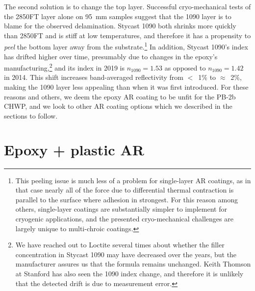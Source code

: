 The second solution is to change the top layer. Successful cryo-mechanical tests of the 2850FT layer alone on 95~mm samples suggest that the 1090 layer is to blame for the observed delamination. Stycast 1090 both shrinks more quickly than 2850FT and is stiff at low temperatures, and therefore it has a propensity to \textit{peel} the bottom layer away from the substrate.\footnote{This peeling issue is much less of a problem for single-layer AR coatings, as in that case nearly all of the force due to differential thermal contraction is parallel to the surface where adhesion in strongest. For this reason among others, single-layer coatings are substantially simpler to implement for cryogenic applications, and the presented cryo-mechanical challenges are largely unique to multi-chroic coatings.} In addition, Stycast 1090's index has drifted higher over time, presumably due to changes in the epoxy's manufacturing,\footnote{We have reached out to Loctite several times about whether the filler concentration in Stycast 1090 may have decreased over the years, but the manufacturer assures us that the formula remains unchanged. Keith Thomson at Stanford has also seen the 1090 index change, and therefore it is unlikely that the detected drift is due to measurement error.} and its index in 2019 is $n_{\mathrm{1090}} = 1.53$ as opposed to $n_{\mathrm{1090}} = 1.42$ in 2014. This shift increases band-averaged reflectivity from $<$~1\% to $\approx$~2\%, making the 1090 layer less appealing than when it was first introduced. For these reasons and others, we deem the epoxy AR coating to be unfit for the PB-2b CHWP, and we look to other AR coating options which we described in the sections to follow.


\section{Epoxy + plastic AR}
\label{sec:sapphire_ar_coating_epoxy_plastic}


